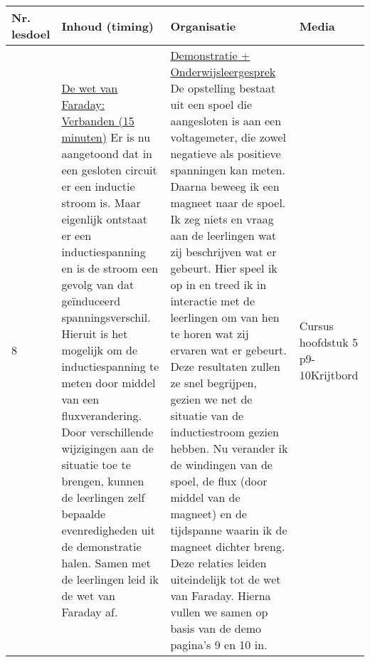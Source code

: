 \begin{landscape}
\begin{tabularx}{1.56\textwidth}{|p{1.5cm}|p{9cm}|X|p{4cm}|}
	\hline
	\textbf{Nr. lesdoel } & \textbf{Inhoud (timing)}  & \textbf{Organisatie } & \textbf{Media } \\ \hline
	8\newline\newline 9\newline\newline 9& \underline{De wet van Faraday:} \underline{Verbanden (15 minuten)}\newline
	Er is nu aangetoond dat in een gesloten circuit er een inductie stroom is. Maar eigenlijk ontstaat er een inductiespanning en is de stroom een gevolg van dat geïnduceerd spanningsverschil. Hieruit is het mogelijk om de inductiespanning te meten door middel van een fluxverandering. Door verschillende wijzigingen aan de situatie toe te brengen, kunnen de leerlingen zelf bepaalde evenredigheden uit de demonstratie halen. Samen met de leerlingen leid ik de wet van Faraday af.
	&  \underline{Demonstratie + Onderwijsleergesprek}\newline 
	De opstelling bestaat uit een spoel die aangesloten is aan een voltagemeter, die zowel negatieve als positieve spanningen kan meten. Daarna beweeg ik een magneet naar de spoel. Ik zeg niets en vraag aan de leerlingen wat zij beschrijven wat er gebeurt. Hier speel ik op in en treed ik in interactie met de leerlingen om van hen te horen wat zij ervaren wat er gebeurt.	Deze resultaten zullen ze snel begrijpen, gezien we net de situatie van de inductiestroom gezien hebben. Nu verander ik de windingen van de spoel, de flux (door middel van de magneet) en de tijdspanne waarin ik de magneet dichter breng. Deze relaties leiden uiteindelijk tot de wet van Faraday. Hierna vullen we samen op basis van de demo pagina's 9 en 10 in. 
	&  Cursus hoofdstuk 5 p9-10\newline\newline Krijtbord
	\\ \hline
\end{tabularx}\vspace{5mm}



\end{landscape}
